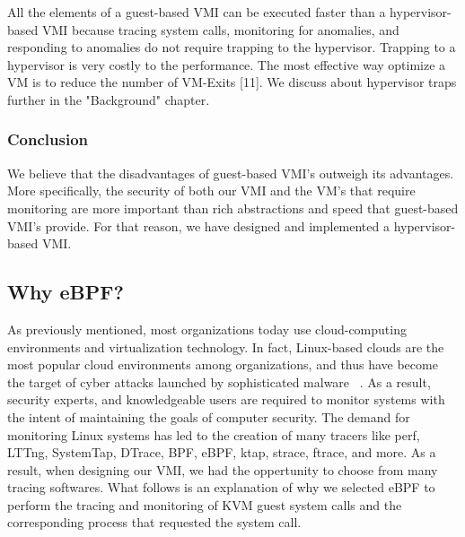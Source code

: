\documentclass{report}
\begin{document}
\begin{spacing}{1.5}
{\large
All the elements of a guest-based VMI can be executed faster than a hypervisor-based VMI because tracing system calls, monitoring for anomalies, and responding to anomalies do not require trapping to the hypervisor. Trapping to a hypervisor is very costly to the performance. The most effective way optimize a VM is to reduce the number of VM-Exits [11]. We discuss about hypervisor traps further in the "Background" chapter. 
\newline
}

\subsubsection{Conclusion}

{\large
We believe that the disadvantages of guest-based VMI's outweigh its advantages. More specifically, the security of both our VMI and the VM's that require monitoring are more important than rich abstractions and speed that guest-based VMI's provide. For that reason, we have designed and implemented a hypervisor-based VMI.
\newline
}
















\subsection{Why eBPF?}

{\large
As previously mentioned, most organizations today use cloud-computing environments and virtualization technology. In fact, Linux-based clouds are the most popular cloud environments among organizations, and thus have become the target of cyber attacks launched by sophisticated malware ~\cite{panker2021leveraging}. As a result, security experts, and knowledgeable users are required to monitor systems with the intent of maintaining the goals of computer security. The demand for monitoring Linux systems has led to the creation of many tracers like perf, LTTng, SystemTap, DTrace, BPF, eBPF, ktap, strace, ftrace, and more. As a result, when designing our VMI, we had the oppertunity to choose from many tracing softwares. What follows is an explanation of why we selected eBPF to perform the tracing and monitoring of KVM guest system calls and the corresponding process that requested the system call.
\newline
}


\end{spacing}
\end{document}
